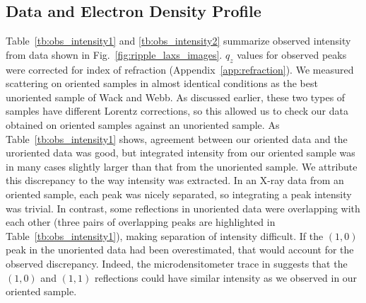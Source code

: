 \subsection{Data and Electron Density Profile}\label{sec:LAXS}
Table~\ref{tb:obs_intensity1} and \ref{tb:obs_intensity2} summarize observed intensity from data shown
in Fig.~\ref{fig:ripple_laxs_images}. $q_z$ values for observed peaks were
corrected for index of refraction (Appendix~\ref{app:refraction}).
We measured scattering on oriented samples in almost identical conditions as the
best unoriented sample of Wack and Webb. As discussed earlier,
these two types of samples have different Lorentz corrections, so 
this allowed us to check our data obtained on 
oriented samples against an unoriented sample. 
As Table~\ref{tb:obs_intensity1} shows, agreement between our oriented data
and the uroriented data was good, but integrated intensity from our oriented
sample was in many cases slightly larger than that from the unoriented sample.
We attribute this discrepancy to the way intensity was extracted. 
In an X-ray data from an oriented sample, each peak
was nicely separated, so integrating a peak intensity was trivial.
In contrast, some reflections in unoriented data were overlapping with
each other (three pairs of overlapping peaks are highlighted in Table~\ref{tb:obs_intensity1}), 
making separation of intensity difficult. If the $(1,0)$ peak in the unoriented 
data had been overestimated, that would account for the observed discrepancy.
Indeed, the microdensitometer trace in \cite{ref:Wack89} suggests that 
the $(1,0)$ and $(1,1)$ reflections could have similar intensity as we observed
in our oriented sample.

